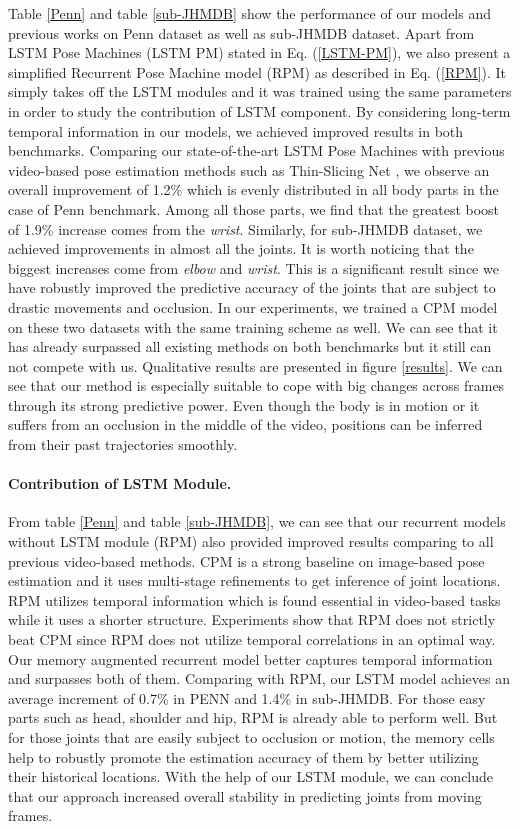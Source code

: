 \documentclass[10pt,twocolumn,letterpaper]{article}
\begin{document}
Table \ref{Penn} and table \ref{sub-JHMDB} show the performance of our models and previous works on Penn dataset as well as sub-JHMDB dataset. Apart from LSTM Pose Machines (LSTM PM) stated in Eq. (\ref{LSTM-PM}), we also present a simplified Recurrent Pose Machine model (RPM) as described in Eq. (\ref{RPM}). It simply takes off the LSTM modules and it was trained using the same parameters in order to study the contribution of LSTM component. By considering long-term temporal information in our models, we achieved improved results in both benchmarks. Comparing our state-of-the-art LSTM Pose Machines with previous video-based pose estimation methods such as Thin-Slicing Net \cite{song17flowAdjST}, we observe an overall improvement of 1.2\% which is evenly distributed in all body parts in the case of Penn benchmark. Among all those parts, we find that the greatest boost of 1.9\% increase comes from the \textit{wrist}. Similarly, for sub-JHMDB dataset, we achieved improvements in almost all the joints. It is worth noticing that the biggest increases come from \textit{elbow} and \textit{wrist}. This is a significant result since we have robustly improved the predictive accuracy of the joints that are subject to drastic movements and occlusion. In our experiments, we trained a CPM model \cite{wei16refineCPM} on these two datasets with the same training scheme as well. We can see that it has already surpassed all existing methods on both benchmarks but it still can not compete with us. Qualitative results are presented in figure \ref{results}. We can see that our method is especially suitable to cope with big changes across frames through its strong predictive power. Even though the body is in motion or it suffers from an occlusion in the middle of the video, positions can be inferred from their past trajectories smoothly. 


\paragraph{Contribution of LSTM Module.} From table \ref{Penn} and table \ref{sub-JHMDB}, we can see that our recurrent models without LSTM module (RPM) also provided improved results comparing to all previous video-based methods. CPM is a strong baseline on image-based pose estimation and it uses multi-stage refinements to get inference of joint locations. RPM utilizes temporal information which is found essential in video-based tasks while it uses a shorter structure. Experiments show that RPM does not strictly beat CPM since RPM does not utilize temporal correlations in an optimal way. Our memory augmented recurrent model better captures temporal information and surpasses both of them. Comparing with RPM, our LSTM model achieves an average increment of 0.7\% in PENN and 1.4\% in sub-JHMDB. For those easy parts such as head, shoulder and hip, RPM is already able to perform well. But for those joints that are easily subject to occlusion or motion, the memory cells help to robustly promote the estimation accuracy of them by better utilizing their historical locations. With the help of our LSTM module, we can conclude that our approach increased overall stability in predicting joints from moving frames.
\end{document}
